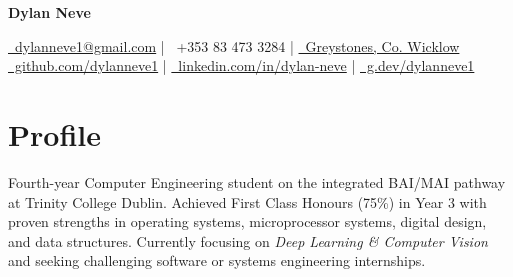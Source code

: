 \documentclass[10pt,a4paper]{article}
\begin{document}
\begin{center}
    {\Huge \bfseries Dylan Neve}
    \vspace{4pt}

    \href{mailto:dylanneve1@gmail.com}{\faEnvelope\ dylanneve1@gmail.com} \quad | \quad
    \faPhone\ +353 83 473 3284 \quad | \quad
    \href{https://www.google.com/maps/place/Greystones,+Co.+Wicklow}{\faMapMarker\ Greystones, Co. Wicklow} \\
    \href{https://github.com/dylanneve1}{\faGithub\ github.com/dylanneve1} \quad | \quad
    \href{https://linkedin.com/in/dylan-neve}{\faLinkedin\ linkedin.com/in/dylan-neve} \quad | \quad
    \href{https://g.dev/dylanneve1}{\faGoogle\ g.dev/dylanneve1}
\end{center}


\section*{Profile}
Fourth-year Computer Engineering student on the integrated BAI/MAI pathway at Trinity College Dublin. Achieved First Class Honours (75\%) in Year 3 with proven strengths in operating systems, microprocessor systems, digital design, and data structures. Currently focusing on \textit{Deep Learning \& Computer Vision} and seeking challenging software or systems engineering internships.


\end{document}
